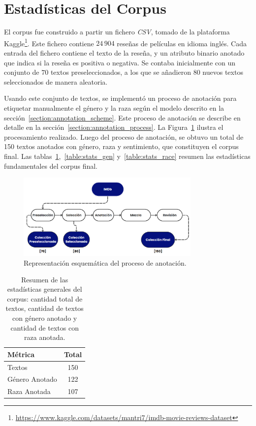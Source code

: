 \section{Estad\'isticas del Corpus}\label{section:corpus_stats}
El corpus fue construido a partir un fichero \emph{CSV}, tomado de la plataforma 
Kaggle\footnote{\url{https://www.kaggle.com/datasets/mantri7/imdb-movie-reviews-dataset}}. 
Este fichero contiene $24\,904$ rese\~nas de pel\'iculas en idioma ingl\'es. Cada entrada del fichero contiene el texto de la rese\~na, 
y un atributo binario anotado que indica si la rese\~na es positiva o negativa. Se contaba inicialmente con un conjunto de $70$ textos 
preseleccionados, a los que se a\~nadieron $80$ nuevos textos seleccionados de manera aleatoria.

Usando este conjunto de textos, se implement\'o un proceso de anotaci\'on para etiquetar manualmente el g\'enero y la raza seg\'un 
el modelo descrito en la secci\'on~\ref{section:annotation_scheme}. Este proceso de anotaci\'on se describe en detalle en la 
secci\'on~\ref{section:annotation_process}. La Figura~\ref{fig:ann_proc} ilustra el procesamiento realizado.
Luego del proceso de anotaci\'on, se obtuvo un total de 150 textos anotados con g\'enero, raza y sentimiento, que constituyen el 
corpus final. Las tablas~\ref{table:stats},~\ref{table:stats_gen} y~\ref{table:stats_race}  resumen las estad\'isticas fundamentales 
del corpus final.

\begin{figure}[htpb]
    \begin{center}
        \includegraphics[width=0.8\textwidth]{Graphics/annotation_proc.png}
    \end{center}
    \caption{Representaci\'on esquem\'atica del proceso de anotaci\'on.}
    \label{fig:ann_proc}
\end{figure}

\begin{table}[htpb]
    \centering
        \begin{tabular}{lc}
        \toprule
        \textbf{M\'etrica} & \textbf{Total} \\
        \midrule
                    Textos & 150 \\
          G\'enero Anotado & 122 \\
              Raza Anotada & 107 \\

        \bottomrule
        \end{tabular}
    \caption{Resumen de las estad\'isticas generales del corpus: cantidad total de textos, cantidad de textos con g\'enero anotado y 
    cantidad de textos con raza anotada.}
    \label{table:stats}
\end{table}

